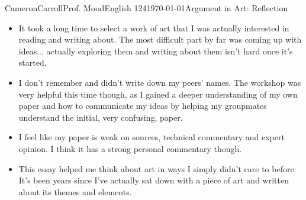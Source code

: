 \documentclass[12pt,letterpaper]{article}
\begin{document}
\begin{mla}{Cameron}{Carroll}{Prof. Mood}{English 124}{\today}{Argument in Art: Reflection}
\begin{itemize}
\item It took a long time to select a work of art that I was actually interested in reading and writing about. The most difficult part by far was coming up with ideas... actually exploring them and writing about them isn't hard once it's started.
\item I don't remember and didn't write down my peers' names. The workshop was very helpful this time though, as I gained a deeper understanding of my own paper and how to communicate my ideas by helping my groupmates understand the initial, very confusing, paper.
\item I feel like my paper is weak on sources, technical commentary and expert opinion. I think it has a strong personal commentary though.
\item This essay helped me think about art in ways I simply didn't care to before. It's been years since I've actually sat down with a piece of art and written about its themes and elements.
\end{itemize}
\end{mla}
\end{document}
